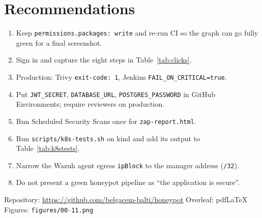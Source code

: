 \documentclass[11pt,a4paper]{article}
\begin{document}
\section{Recommendations}
\label{sec:rec}
\begin{enumerate}
  \item Keep \texttt{permissions.packages: write} and re-run CI so the graph can go fully green for a final screenshot.
  \item Sign in and capture the eight steps in Table~\ref{tab:clicks}.
  \item Production: Trivy \texttt{exit-code: 1}, Jenkins \texttt{FAIL\_ON\_CRITICAL=true}.
  \item Put \texttt{JWT\_SECRET}, \texttt{DATABASE\_URL}, \texttt{POSTGRES\_PASSWORD} in GitHub Environments; require reviewers on production.
  \item Run Scheduled Security Scans once for \texttt{zap-report.html}.
  \item Run \texttt{scripts/k8s-tests.sh} on kind and add its output to Table~\ref{tab:k8stests}.
  \item Narrow the Wazuh agent egress \texttt{ipBlock} to the manager address (\texttt{/32}).
  \item Do not present a green honeypot pipeline as ``the application is secure''.
\end{enumerate}

\vspace{0.8em}
{\small\color{muted}Repository: \url{https://github.com/belgacem-balti/honeypot} \quad Overleaf: pdfLaTeX \quad Figures: \texttt{figures/00}--\texttt{11.png}}
\end{document}

